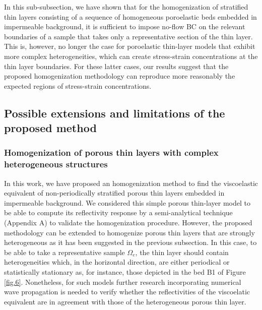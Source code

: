 \documentclass[draft]{agujournal2019}
\begin{document}
In this sub-subsection, we have shown that for the homogenization of stratified thin layers consisting of a sequence of homogeneous poroelastic beds embedded in impermeable background, it is sufficient to impose no-flow BC on the relevant boundaries of a sample that takes only a representative section of the thin layer. This is, however, no longer the case for poroelastic thin-layer models that exhibit more complex heterogeneities, which can create stress-strain concentrations at the thin layer boundaries. For these latter cases, our results suggest that the proposed homogenization methodology can reproduce more reasonably the expected regions of stress-strain concentrations.

\subsection{Possible extensions and limitations of the proposed method}

\subsubsection{Homogenization of porous thin layers with complex heterogeneous structures}
In this work, we have proposed an homogenization method to find the viscoelastic equivalent of non-periodically stratified porous thin layers embedded in impermeable background. We considered this simple porous thin-layer model to be able to compute its reflectivity response by a semi-analytical technique (Appendix A) to validate the homogenization procedure. However, the proposed methodology  can be extended to homogenize porous thin layers that are strongly heterogeneous as it has been suggested in the previous subsection. In this case, to be able to take a representative sample $\Omega_e$, the thin layer should contain heterogeneities which, in the horizontal direction, are either periodical or statistically stationary as, for instance, those depicted in the bed B1 of Figure \ref{fig.6}. Nonetheless, for such models further research incorporating numerical wave propagation is needed to verify whether the reflectivities of the viscoelatic equivalent are in agreement with those of the heterogeneous porous thin layer. 
\end{document}
